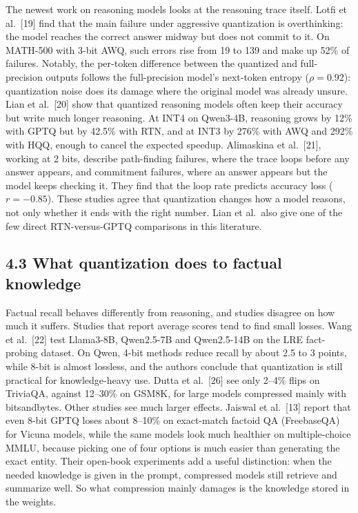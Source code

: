 \documentclass[10pt,twocolumn]{article}
\begin{document}
The newest work on reasoning models looks at the reasoning trace
itself. Lotfi et al.~[19] find that the main failure under aggressive
quantization is overthinking: the model reaches the correct answer
midway but does not commit to it. On MATH-500 with 3-bit AWQ, such
errors rise from 19 to 139 and make up 52\% of failures. Notably, the
per-token difference between the quantized and full-precision outputs
follows the full-precision model's next-token entropy ($\rho = 0.92$):
quantization noise does its damage where the original model was already
unsure. Lian et al.~[20] show that quantized reasoning models often keep
their accuracy but write much longer reasoning. At INT4 on Qwen3-4B,
reasoning grows by 12\% with GPTQ but by 42.5\% with RTN, and at INT3 by
276\% with AWQ and 292\% with HQQ, enough to cancel the expected
speedup. Alimaskina et al.~[21], working at 2 bits, describe
path-finding failures, where the trace loops before any answer appears,
and commitment failures, where an answer appears but the model keeps
checking it. They find that the loop rate predicts accuracy loss
($r = -0.85$). These studies agree that quantization changes how a
model reasons, not only whether it ends with the right number. Lian et
al.~also give one of the few direct RTN-versus-GPTQ comparisons in this
literature.

\subsection{4.3 What quantization does to factual knowledge}

Factual recall behaves differently from reasoning, and studies disagree
on how much it suffers. Studies that report average scores tend to find
small losses. Wang et al.~[22] test Llama3-8B, Qwen2.5-7B and
Qwen2.5-14B on the LRE fact-probing dataset. On Qwen, 4-bit methods
reduce recall by about 2.5 to 3 points, while 8-bit is almost lossless,
and the authors conclude that quantization is still practical for
knowledge-heavy use. Dutta et al.~[26] see only 2--4\% flips on
TriviaQA, against 12--30\% on GSM8K, for large models compressed mainly
with bitsandbytes. Other studies see much larger effects. Jaiswal et
al.~[13] report that even 8-bit GPTQ loses about 8--10\% on exact-match
factoid QA (FreebaseQA) for Vicuna models, while the same models look
much healthier on multiple-choice MMLU, because picking one of four
options is much easier than generating the exact entity. Their open-book
experiments add a useful distinction: when the needed knowledge is given
in the prompt, compressed models still retrieve and summarize well. So
what compression mainly damages is the knowledge stored in the weights.
\end{document}

